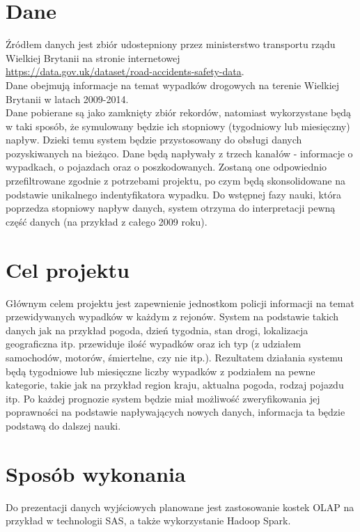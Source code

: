 \documentclass{article}
\begin{document}
\section{Dane}

Źródłem danych jest zbiór udostepniony przez ministerstwo transportu rządu Wielkiej Brytanii na stronie internetowej\\ \url{https://data.gov.uk/dataset/road-accidents-safety-data}. \\Dane obejmują informacje na temat wypadków drogowych na terenie Wielkiej Brytanii w latach 2009-2014.\\

Dane pobierane są jako zamknięty zbiór rekordów, natomiast wykorzystane będą w taki sposób, że symulowany będzie ich stopniowy (tygodniowy lub miesięczny) napływ. Dzieki temu system będzie przystosowany do obsługi danych pozyskiwanych na bieżąco. Dane będą napływały z trzech kanałów - informacje o wypadkach, o pojazdach oraz o poszkodowanych. Zostaną one odpowiednio przefiltrowane zgodnie z potrzebami projektu, po czym będą skonsolidowane na podstawie unikalnego indentyfikatora wypadku. Do wstępnej fazy nauki, która poprzedza stopniowy napływ danych, system otrzyma do interpretacji pewną część danych (na przykład z całego 2009 roku).


\section{Cel projektu}

Głównym celem projektu jest zapewnienie jednostkom policji informacji na temat przewidywanych wypadków w każdym z rejonów. System na podstawie takich danych jak na przykład pogoda, dzień tygodnia, stan drogi, lokalizacja geograficzna itp. przewiduje ilość wypadków oraz ich typ (z udziałem samochodów, motorów, śmiertelne, czy nie itp.). Rezultatem działania systemu będą tygodniowe lub miesięczne liczby wypadków z podziałem na pewne kategorie, takie jak na przykład region kraju, aktualna pogoda, rodzaj pojazdu itp. Po każdej prognozie system będzie miał możliwość zweryfikowania jej poprawności na podstawie napływających nowych danych, informacja ta będzie podstawą do dalszej nauki.


\section{Sposób wykonania}
Do prezentacji danych wyjściowych planowane jest zastosowanie kostek OLAP na przykład w technologii SAS, a także wykorzystanie Hadoop Spark.\\
\end{document}
